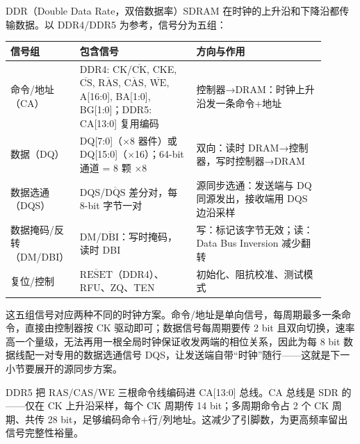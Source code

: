 DDR（Double Data Rate，双倍数据率）SDRAM 在时钟的上升沿和下降沿都传输数据。以 DDR4/DDR5 为参考，信号分为五组：

\begin{longtable}{L{0.14\linewidth}L{0.36\linewidth}L{0.4\linewidth}}
\toprule
信号组 & 包含信号 & 方向与作用 \\
\midrule
命令/地址（CA） & DDR4: CK/$\overline{\text{CK}}$, CKE, $\overline{\text{CS}}$, $\overline{\text{RAS}}$, $\overline{\text{CAS}}$, $\overline{\text{WE}}$, A[16:0], BA[1:0], BG[1:0]；DDR5: CA[13:0] 复用编码 & 控制器→DRAM：时钟上升沿发一条命令+地址 \\\tablerowrule
数据（DQ） & DQ[7:0]（$\times$8 器件）或 DQ[15:0]（$\times$16）；64-bit 通道 = 8 颗 $\times$8 & 双向：读时 DRAM→控制器，写时控制器→DRAM \\\tablerowrule
数据选通（DQS） & DQS/$\overline{\text{DQS}}$ 差分对，每 8-bit 字节一对 & 源同步选通：发送端与 DQ 同源发出，接收端用 DQS 边沿采样 \\\tablerowrule
数据掩码/反转（DM/DBI） & DM/$\overline{\text{DBI}}$：写时掩码，读时 DBI & 写：标记该字节无效；读：Data Bus Inversion 减少翻转 \\\tablerowrule
复位/控制 & $\overline{\text{RESET}}$（DDR4）、RFU、ZQ、TEN & 初始化、阻抗校准、测试模式 \\
\bottomrule
\end{longtable}

这五组信号对应两种不同的时钟方案。命令/地址是单向信号，每周期最多一条命令，直接由控制器按 CK 驱动即可；数据信号每周期要传 2 bit 且双向切换，速率高一个量级，无法再用一根全局时钟保证收发两端的相位关系，因此为每 8 bit 数据线配一对专用的数据选通信号 DQS，让发送端自带“时钟”随行——这就是下一小节要展开的源同步方案。

DDR5 把 RAS/CAS/WE 三根命令线编码进 CA[13:0] 总线。CA 总线是 SDR 的——仅在 CK 上升沿采样，每个 CK 周期传 14 bit；多周期命令占 2 个 CK 周期、共传 28 bit，足够编码命令+行/列地址。这减少了引脚数，为更高频率留出信号完整性裕量。

